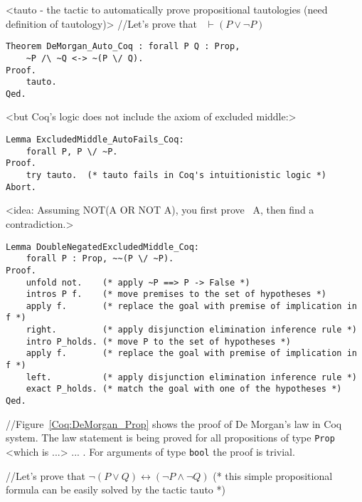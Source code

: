 \documentclass[article]{aaltoseries}
\begin{document}
<tauto - the tactic to automatically prove propositional tautologies (need definition of tautology)>
//Let's prove that ~$\vdash (P \lor \neg P) $
\begin{lstlisting}[language=coq]
Theorem DeMorgan_Auto_Coq : forall P Q : Prop, 
    ~P /\ ~Q <-> ~(P \/ Q).
Proof.
    tauto.
Qed.
\end{lstlisting}


<but Coq's logic does not include the axiom of excluded middle:>
\begin{lstlisting}[language=coq]
Lemma ExcludedMiddle_AutoFails_Coq:
    forall P, P \/ ~P.
Proof.
    try tauto.  (* tauto fails in Coq's intuitionistic logic *)
Abort.
\end{lstlisting}

<idea: Assuming NOT(A OR NOT A), you first prove ~A, then find a contradiction.>

\begin{lstlisting}[language=coq]
Lemma DoubleNegatedExcludedMiddle_Coq:
    forall P : Prop, ~~(P \/ ~P).
Proof.
    unfold not.    (* apply ~P ==> P -> False *)
    intros P f.    (* move premises to the set of hypotheses *)
    apply f.       (* replace the goal with premise of implication in f *)
    right.         (* apply disjunction elimination inference rule *)
    intro P_holds. (* move P to the set of hypotheses *)
    apply f.       (* replace the goal with premise of implication in f *)
    left.          (* apply disjunction elimination inference rule *)
    exact P_holds. (* match the goal with one of the hypotheses *)
Qed.
\end{lstlisting}



//Figure~\ref{Coq:DeMorgan_Prop} shows the proof of De Morgan's law in Coq system. The law statement is being proved for all propositions of type \texttt{Prop}  <which is ...> ... . For arguments of type \texttt{bool} the proof is trivial.

//Let's prove that $\neg (P \lor Q) \leftrightarrow (\neg P \land \neg Q)$
    (* this simple propositional formula can be easily solved by the tactic tauto *)
    
\end{document}
